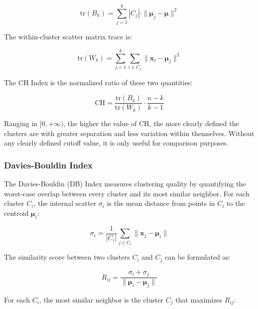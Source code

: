 \begin{equation}
    \mathrm{tr}(B_k) = \sum_{j=1}^{k} |C_j| \cdot \|\boldsymbol{\mu}_j - \boldsymbol{\mu}\|^2
    \label{eq:ch_between}
\end{equation}

The within-cluster scatter matrix trace is:

\begin{equation}
    \mathrm{tr}(W_k) = \sum_{j=1}^{k} \sum_{i \in C_j} \|\mathbf{x}_i - \boldsymbol{\mu}_j\|^2
    \label{eq:ch_within}
\end{equation}

The CH Index is the normalized ratio of these two quantities:

\begin{equation}
    \mathrm{CH} = \frac{\mathrm{tr}(B_k)}{\mathrm{tr}(W_k)} \cdot \frac{n - k}{k - 1}
    \label{eq:ch}
\end{equation}

Ranging in $[0, +\infty)$, the higher the value of CH, the more clearly defined the clusters are with greater separation and less variation within themselves. Without any clearly defined cutoff value, it is only useful for comparison purposes.

\subsubsection*{Davies-Bouldin Index}

The Davies-Bouldin (DB) Index \cite{davies1979} measures clustering quality by quantifying the worst-case overlap between every cluster and its most similar neighbor. For each cluster $C_i$, the internal scatter $\sigma_i$ is the mean distance from points in $C_i$ to the centroid $\boldsymbol{\mu}_i$:

\begin{equation}
    \sigma_i = \frac{1}{|C_i|} \sum_{j \in C_i} \|\mathbf{x}_j - \boldsymbol{\mu}_i\|
    \label{eq:db_sigma}
\end{equation}

The similarity score between two clusters $C_i$ and $C_j$ can be formulated as:

\begin{equation}
    R_{ij} = \frac{\sigma_i + \sigma_j}{\|\boldsymbol{\mu}_i - \boldsymbol{\mu}_j\|}
    \label{eq:db_Rij}
\end{equation}

For each $C_i$, the most similar neighbor is the cluster $C_j$ that maximizes $R_{ij}$:

